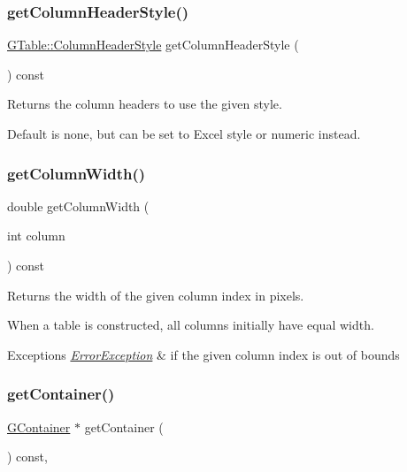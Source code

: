 \subsubsection{\texorpdfstring{get\+Column\+Header\+Style()}{getColumnHeaderStyle()}}
{\footnotesize\ttfamily \mbox{\hyperlink{classGTable_a060cff504451bbb98530e64e936e2671}{G\+Table\+::\+Column\+Header\+Style}} get\+Column\+Header\+Style (\begin{DoxyParamCaption}{ }\end{DoxyParamCaption}) const\hspace{0.3cm}{\ttfamily [virtual]}}



Returns the column headers to use the given style. 

Default is none, but can be set to Excel style or numeric instead. \mbox{\label{classGTable_a4722043b7c3f968238968d3053b8a277}} 
\subsubsection{\texorpdfstring{get\+Column\+Width()}{getColumnWidth()}}
{\footnotesize\ttfamily double get\+Column\+Width (\begin{DoxyParamCaption}\item[{int}]{column }\end{DoxyParamCaption}) const\hspace{0.3cm}{\ttfamily [virtual]}}



Returns the width of the given column index in pixels. 

When a table is constructed, all columns initially have equal width. 
\begin{DoxyExceptions}{Exceptions}
{\em \mbox{\hyperlink{classErrorException}{Error\+Exception}}} & if the given column index is out of bounds \\
\hline
\end{DoxyExceptions}
\mbox{\label{classGInteractor_a7a6e317c29d61030929b4cd2d1c00fe7}} 
\subsubsection{\texorpdfstring{get\+Container()}{getContainer()}}
{\footnotesize\ttfamily \mbox{\hyperlink{classGContainer}{G\+Container}} $\ast$ get\+Container (\begin{DoxyParamCaption}{ }\end{DoxyParamCaption}) const\hspace{0.3cm}{\ttfamily [virtual]}, {\ttfamily [inherited]}}



